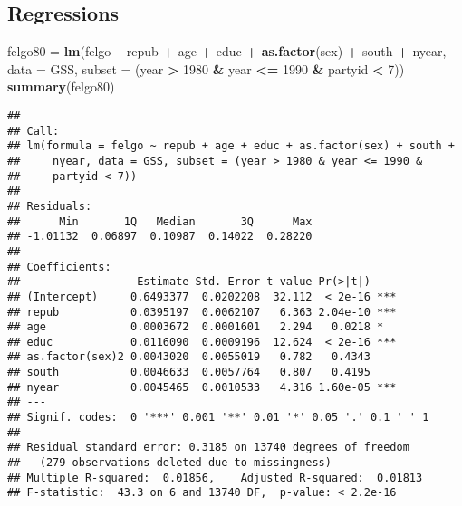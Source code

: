 \documentclass[]{article}
\newenvironment{Shaded}{\begin{snugshade}}{\end{snugshade}}
\newcommand{\DataTypeTok}[1]{\textcolor[rgb]{0.13,0.29,0.53}{#1}}
\newcommand{\DecValTok}[1]{\textcolor[rgb]{0.00,0.00,0.81}{#1}}
\newcommand{\KeywordTok}[1]{\textcolor[rgb]{0.13,0.29,0.53}{\textbf{#1}}}
\newcommand{\NormalTok}[1]{#1}
\newcommand{\OperatorTok}[1]{\textcolor[rgb]{0.81,0.36,0.00}{\textbf{#1}}}
\newcommand{\StringTok}[1]{\textcolor[rgb]{0.31,0.60,0.02}{#1}}
\begin{document}
\hypertarget{regressions}{%
\subsection{Regressions}\label{regressions}}

\begin{Shaded}
\begin{Highlighting}[]
\NormalTok{felgo80 =}\StringTok{ }\KeywordTok{lm}\NormalTok{(felgo }\OperatorTok{~}\StringTok{ }\NormalTok{repub }\OperatorTok{+}\StringTok{ }\NormalTok{age }\OperatorTok{+}\StringTok{ }\NormalTok{educ }\OperatorTok{+}\StringTok{ }\KeywordTok{as.factor}\NormalTok{(sex) }\OperatorTok{+}\StringTok{ }\NormalTok{south }\OperatorTok{+}\StringTok{ }\NormalTok{nyear, }\DataTypeTok{data =}\NormalTok{ GSS, }\DataTypeTok{subset =}\NormalTok{ (year }\OperatorTok{>}\StringTok{ }\DecValTok{1980} \OperatorTok{&}\StringTok{ }\NormalTok{year }\OperatorTok{<=}\StringTok{ }\DecValTok{1990} \OperatorTok{&}\StringTok{ }\NormalTok{partyid }\OperatorTok{<}\StringTok{ }\DecValTok{7}\NormalTok{))}
\KeywordTok{summary}\NormalTok{(felgo80)}
\end{Highlighting}
\end{Shaded}

\begin{verbatim}
## 
## Call:
## lm(formula = felgo ~ repub + age + educ + as.factor(sex) + south + 
##     nyear, data = GSS, subset = (year > 1980 & year <= 1990 & 
##     partyid < 7))
## 
## Residuals:
##      Min       1Q   Median       3Q      Max 
## -1.01132  0.06897  0.10987  0.14022  0.28220 
## 
## Coefficients:
##                  Estimate Std. Error t value Pr(>|t|)    
## (Intercept)     0.6493377  0.0202208  32.112  < 2e-16 ***
## repub           0.0395197  0.0062107   6.363 2.04e-10 ***
## age             0.0003672  0.0001601   2.294   0.0218 *  
## educ            0.0116090  0.0009196  12.624  < 2e-16 ***
## as.factor(sex)2 0.0043020  0.0055019   0.782   0.4343    
## south           0.0046633  0.0057764   0.807   0.4195    
## nyear           0.0045465  0.0010533   4.316 1.60e-05 ***
## ---
## Signif. codes:  0 '***' 0.001 '**' 0.01 '*' 0.05 '.' 0.1 ' ' 1
## 
## Residual standard error: 0.3185 on 13740 degrees of freedom
##   (279 observations deleted due to missingness)
## Multiple R-squared:  0.01856,    Adjusted R-squared:  0.01813 
## F-statistic:  43.3 on 6 and 13740 DF,  p-value: < 2.2e-16
\end{verbatim}
\end{document}
